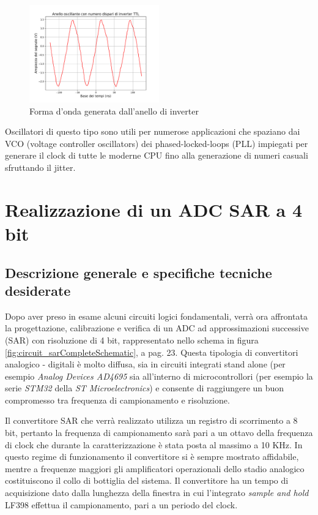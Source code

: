 \documentclass[journal]{IEEEtran}
\begin{document}
\begin{figure}[H]%
\begin{center}
\includegraphics[width=0.50\textwidth]{analysis/output/oscillating-ring.pdf}
\caption{Forma d'onda generata dall'anello di inverter}
\label{fig:graph_ring_oscillator}
\end{center}
\end{figure}

Oscillatori di questo tipo sono utili per numerose applicazioni che spaziano dai VCO (voltage controller oscillators) dei phased-locked-loops (PLL) impiegati per generare il clock di tutte le moderne CPU fino alla generazione di numeri casuali sfruttando il jitter.


\section{Realizzazione di un ADC SAR a 4 bit}

\subsection{Descrizione generale e specifiche tecniche desiderate}
Dopo aver preso in esame alcuni circuiti logici fondamentali, verrà ora affrontata la progettazione, calibrazione e verifica di un ADC ad approssimazioni successive (SAR) con risoluzione di 4 bit, rappresentato nello schema in figura \ref{fig:circuit_sarCompleteSchematic}, a pag. 23. Questa tipologia di convertitori analogico - digitali è molto diffusa, sia in circuiti integrati stand alone (per esempio \textit{Analog Devices AD4695} sia all'interno di microcontrollori (per esempio la serie \textit{STM32} della \textit{ST Microelectronics}) e consente di raggiungere un buon compromesso tra frequenza di campionamento e risoluzione.

Il convertitore SAR che verrà realizzato utilizza un registro di scorrimento a 8 bit, pertanto la frequenza di campionamento sarà pari a un ottavo della frequenza di clock che durante la caratterizzazione è stata posta al massimo a 10 KHz. In questo regime di funzionamento il convertitore si è sempre mostrato affidabile, mentre a frequenze maggiori gli amplificatori operazionali dello stadio analogico costituiscono il collo di bottiglia del sistema. Il convertitore ha un tempo di acquisizione dato dalla lunghezza della finestra in cui l'integrato \textit{sample and hold} LF398 effettua il campionamento, pari a un periodo del clock.
\end{document}
